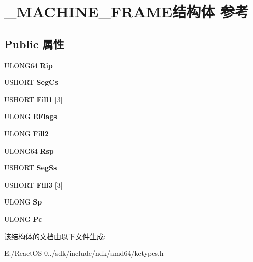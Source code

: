 \hypertarget{struct___m_a_c_h_i_n_e___f_r_a_m_e}{}\section{\+\_\+\+M\+A\+C\+H\+I\+N\+E\+\_\+\+F\+R\+A\+M\+E结构体 参考}
\label{struct___m_a_c_h_i_n_e___f_r_a_m_e}
\subsection*{Public 属性}
\begin{DoxyCompactItemize}
\item 
\mbox{\label{struct___m_a_c_h_i_n_e___f_r_a_m_e_aded40940f2754988262749167e8ae3ae}} 
U\+L\+O\+N\+G64 {\bfseries Rip}
\item 
\mbox{\label{struct___m_a_c_h_i_n_e___f_r_a_m_e_ae6efa8ed9c51791b981568396c99439f}} 
U\+S\+H\+O\+RT {\bfseries Seg\+Cs}
\item 
\mbox{\label{struct___m_a_c_h_i_n_e___f_r_a_m_e_a44804aea2ecd4d97e6da51dcdcd3d41d}} 
U\+S\+H\+O\+RT {\bfseries Fill1} \mbox{[}3\mbox{]}
\item 
\mbox{\label{struct___m_a_c_h_i_n_e___f_r_a_m_e_a5b5105d36f74f31fae173efd0777ca9c}} 
U\+L\+O\+NG {\bfseries E\+Flags}
\item 
\mbox{\label{struct___m_a_c_h_i_n_e___f_r_a_m_e_a4227abddd31498687156beff022a302c}} 
U\+L\+O\+NG {\bfseries Fill2}
\item 
\mbox{\label{struct___m_a_c_h_i_n_e___f_r_a_m_e_ad469a4803b92cfdc281779db974dc5be}} 
U\+L\+O\+N\+G64 {\bfseries Rsp}
\item 
\mbox{\label{struct___m_a_c_h_i_n_e___f_r_a_m_e_a03579d9644606d1136320664d097b803}} 
U\+S\+H\+O\+RT {\bfseries Seg\+Ss}
\item 
\mbox{\label{struct___m_a_c_h_i_n_e___f_r_a_m_e_ad643174869552e7fcf4d908d7ff17229}} 
U\+S\+H\+O\+RT {\bfseries Fill3} \mbox{[}3\mbox{]}
\item 
\mbox{\label{struct___m_a_c_h_i_n_e___f_r_a_m_e_ac03f132e01d3b2d37c52608b5bcfd26c}} 
U\+L\+O\+NG {\bfseries Sp}
\item 
\mbox{\label{struct___m_a_c_h_i_n_e___f_r_a_m_e_afc90141b4280583b7406684f8ec99c39}} 
U\+L\+O\+NG {\bfseries Pc}
\end{DoxyCompactItemize}


该结构体的文档由以下文件生成\+:\begin{DoxyCompactItemize}
\item 
E\+:/\+React\+O\+S-\/0../sdk/include/ndk/amd64/ketypes.\+h\end{DoxyCompactItemize}
